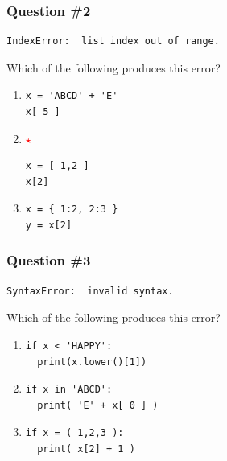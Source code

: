 \documentclass[11pt]{beamer}
\newcommand{\correctstar}{\textcolor{red}{$\star$}}
\begin{document}
\begin{frame}[fragile]
  \frametitle{Question \#2}
  \Enlarge

  \begin{Verbatim}
IndexError:  list index out of range.
  \end{Verbatim}

  Which of the following produces this error?

  \begin{enumerate}[label=\Alph*]
  \item
  \begin{Verbatim}
x = 'ABCD' + 'E'
x[ 5 ]
  \end{Verbatim}
  \item  \correctstar
  \begin{Verbatim}
x = [ 1,2 ]
x[2]
  \end{Verbatim}
  \item
  \begin{Verbatim}
x = { 1:2, 2:3 }
y = x[2]
  \end{Verbatim}
  \end{enumerate}
\end{frame}

\begin{frame}[fragile]
  \frametitle{Question \#3}
  \Enlarge

  \begin{Verbatim}
SyntaxError:  invalid syntax.
  \end{Verbatim}

  Which of the following produces this error?

  \begin{enumerate}[label=\Alph*]
  \item
  \begin{Verbatim}
if x < 'HAPPY':
  print(x.lower()[1])
  \end{Verbatim}
  \item
  \begin{Verbatim}
if x in 'ABCD':
  print( 'E' + x[ 0 ] )
  \end{Verbatim}
  \item
  \begin{Verbatim}
if x = ( 1,2,3 ):
  print( x[2] + 1 )
  \end{Verbatim}
  \end{enumerate}
\end{frame}
\end{document}
